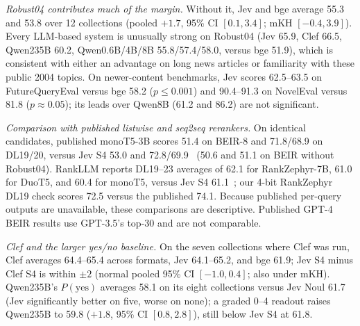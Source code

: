 \emph{Robust04 contributes much of the margin.} Without it, Jev and bge average 55.3 and 53.8 over 12 collections (pooled $+1.7$, 95\% CI $[0.1,3.4]$; mKH $[-0.4,3.9]$). Every LLM-based system is unusually strong on Robust04 (Jev 65.9, Clef 66.5, Qwen235B 60.2, Qwen0.6B/4B/8B 55.8/57.4/58.0, versus bge 51.9), which is consistent with either an advantage on long news articles or familiarity with these public 2004 topics. On newer-content benchmarks, Jev scores 62.5--63.5 on FutureQueryEval versus bge 58.2 ($p\le0.001$) and 90.4--91.3 on NovelEval versus 81.8 ($p\approx0.05$); its leads over Qwen8B (61.2 and 86.2) are not significant.

\emph{Comparison with published listwise and seq2seq rerankers.} On identical candidates, published monoT5-3B scores 51.4 on BEIR-8 and 71.8/68.9 on DL19/20, versus Jev S4 53.0 and 72.8/69.9~\cite{sun2023rankgpt} (50.6 and 51.1 on BEIR without Robust04). RankLLM reports DL19--23 averages of 62.1 for RankZephyr-7B, 61.0 for DuoT5, and 60.4 for monoT5, versus Jev S4 61.1~\cite{rankllm}; our 4-bit RankZephyr DL19 check scores 72.5 versus the published 74.1. Because published per-query outputs are unavailable, these comparisons are descriptive. Published GPT-4 BEIR results use GPT-3.5's top-30 and are not comparable.

\emph{Clef and the larger yes/no baseline.} On the seven collections where Clef was run, Clef averages 64.4--65.4 across formats, Jev 64.1--65.2, and bge 61.9; Jev S4 minus Clef S4 is within $\pm2$ (normal pooled 95\% CI $[-1.0,0.4]$; also under mKH). Qwen235B's $P(\text{yes})$ averages 58.1 on its eight collections versus Jev Noul 61.7 (Jev significantly better on five, worse on none); a graded 0--4 readout raises Qwen235B to 59.8 ($+1.8$, 95\% CI $[0.8,2.8]$), still below Jev S4 at 61.8.

